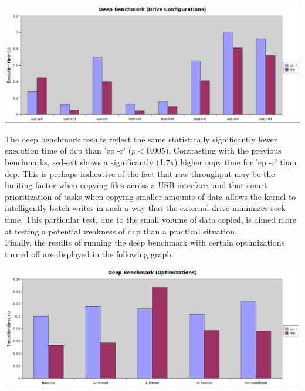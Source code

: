 \documentclass[12pt]{article}
\begin{document}
\vspace{5mm}

\includegraphics[width=500pt]{report/graphs/deep-manydisk.png}

\vspace{5mm}

The deep benchmark results reflect the same statistically significantly lower
execution time of dcp than 'cp -r' ($p < 0.005$). Contrasting with the previous
benchmarks, ssd-ext shows a significantly (1.7x) higher copy time for 'cp -r' than
dcp. This is perhaps indicative of the fact that raw throughput may be the limiting
factor when copying files across a USB interface, and that smart prioritization of
tasks when copying smaller amounts of data allows the kernel to intelligently
batch writes in such a way that the external drive minimizes seek time. This particular
test, due to the small volume of data copied, is aimed more at testing a potential weakness
of dcp than a practical situation. \\

Finally, the results of running the deep benchmark with certain optimizations turned off
are displayed in the following graph.\\

\vspace{5mm}

\includegraphics[width=500pt]{report/graphs/deep-optimizations.png}

\vspace{5mm}
\end{document}

